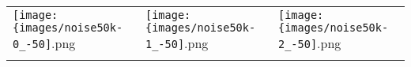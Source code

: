  \begin{tabular}{lll}
\texttt{[image: \{images/noise50k-0\_-50]}.png} &\texttt{[image: \{images/noise50k-1\_-50]}.png} &\texttt{[image: \{images/noise50k-2\_-50]}.png} 
 \\ \hfill\end{tabular}
